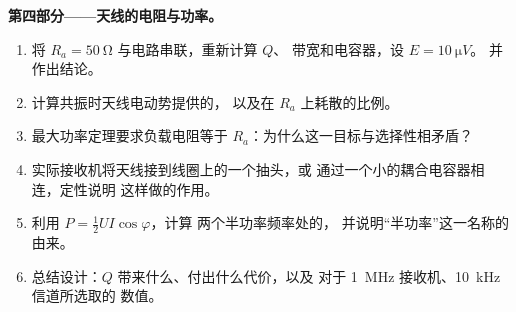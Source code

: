 \begin{problem}
\medskip
\noindent\textbf{第四部分——天线的电阻与功率。}
\begin{enumerate}[resume]
  \item 将 $R_a = \qty{50}{\ohm}$ 与电路串联，重新计算 $Q$、
        带宽和电容器，设 $E = \qty{10}{\micro V}$。
        并作出结论。
  \item 计算共振时天线电动势提供的，
        以及在 $R_a$ 上耗散的比例。
  \item 最大功率定理要求负载电阻等于
        $R_a$：为什么这一目标与选择性相矛盾？
  \item 实际接收机将天线接到线圈上的一个抽头，或
        通过一个小的耦合电容器相连，定性说明
        这样做的作用。
  \item 利用 $P = \tfrac12 UI\cos\varphi$，计算
        两个半功率频率处的，
        并说明“半功率”这一名称的由来。
  \item 总结设计：$Q$ 带来什么、付出什么代价，以及
        对于 \qty{1}{MHz} 接收机、\qty{10}{kHz} 信道所选取的
        数值。
\end{enumerate}
\end{problem}

